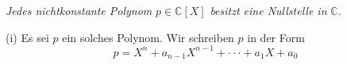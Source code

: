 \documentclass[a4paper,twoside]{book}
\begin{document}
\noindent{} \textit{Jedes nichtkonstante Polynom} $p \in \mathbb{C}[X]$ \textit{besitzt eine Nullstelle in} $\mathbb{C}$\textit{.}

\begin{Beweis} (i) Es sei $p$ ein solches Polynom. Wir schreiben $p$ in der Form
\begin{equation*}
p = X^n + a_{n-1}X^{n-1} + \cdot\cdot\cdot + a_1X + a_0
\end{equation*}
\end{Beweis}
\end{document}
